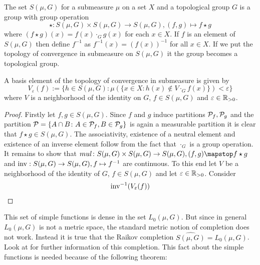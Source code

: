 \begin{thm}
  The set $S(\mu, G)$ for a submeasure $\mu$ on a set $X$ and a topological group $G$ is a group with group operation
  \begin{equation*}
    \star\colon S(\mu, G) \times S(\mu, G) \to S(\mu, G), (f, g) \mapsto f \star g
  \end{equation*}
  where $(f\star g)(x) = f(x) \cdot_G g(x)$ for each $x \in X$. If $f$ is an element of $S(\mu, G)$ then define $f^{-1}$ as $f^{-1}(x) = (f(x))^{-1}$ for all $x \in X$. If we put the topology of convergence in submeasure on $S(\mu, G)$ it the group
  becomes a topological group.

  A basis element of the topology of convergence in submeasure is given by
  \begin{equation*}
    V_\varepsilon(f) := \{ h \in S(\mu, G)\colon \mu(\{x \in X\colon h(x) \notin V\cdot_G f(x)\}) < \varepsilon \}
  \end{equation*}
  where $V$ is a neighborhood of the identity on $G$, $f \in S(\mu, G)$ and $\varepsilon \in \R_{>0}$.
\end{thm}

\begin{proof}
  Firstly let $f, g \in S(\mu, G)$. Since $f$ and $g$ induce partitions $\P_f, \P_g$ and the partition $\P = \{A \cap B\colon A \in \P_f, B \in \P_g\}$ is again a measurable partition it is clear that $f \star g \in S(\mu, G)$. The associativity, existence of a neutral element and existence of an inverse element follow from the fact that $\cdot_G$ is a group operation.
  It remains to show that $mul\colon S(\mu, G)\times S(\mu, G) \to S(\mu, G), (f, g) \mapstop f\star g$ and ${\rm inv}: S(\mu, G) \to S(\mu, G), f \mapsto f^{-1}$ are continuous. To this end let $V$ be a neighborhood of the identity of $G$, $f \in S(\mu, G)$ and let $\varepsilon \in \R_{>0}$. Consider
  \begin{align*}
    {\rm inv}^{-1}(V_\varepsilon(f))
  \end{align*}
  
\end{proof}

This set of simple functions is dense in the set $L_0(\mu, G)$. But since in general $L_0(\mu, G)$ is not a metric space, the standard metric notion of completion does not work. Instead it is true that the Raikov completion $\widehat{S(\mu, G)} = L_0(\mu, G)$. Look at \cite{} for further information of this completion. This fact about the simple functions is needed because of the following theorem:
\begin{thm}
  
\end{thm}

